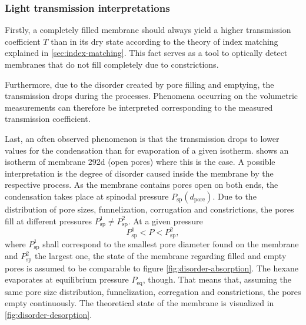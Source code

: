 \documentclass[../thesis.tex]{subfiles}
\begin{document}
            \subsubsection{Light transmission interpretations}
            \label{subsec:light-transmission-interpretation}

                

                Firstly, a completely filled membrane should always yield a higher transmission coefficient $T$ than in its dry state according to the theory of index matching explained in \cref{sec:index-matching}. This fact serves as a tool to optically detect membranes that do not fill completely due to constrictions.

                Furthermore, due to the disorder created by pore filling and emptying, the transmission drops during the processes. Phenomena occurring on the volumetric measurements can therefore be interpreted corresponding to the measured transmission coefficient.

                Last, an often observed phenomenon is that the transmission drops to lower values for the condensation than for evaporation of a given isotherm.  shows an isotherm of membrane 292d (open pores) where this is the case. A possible interpretation is the degree of disorder caused inside the membrane by the respective process. As the membrane contains pores open on both ends, the condensation takes place at spinodal pressure $P_\mathrm{sp}(d_\mathrm{pore})$. Due to the distribution of pore sizes, funnelization, corrugation and constrictions, the pores fill at different pressures $P_\mathrm{sp}^1 \neq P_\mathrm{sp}^2$. At a given pressure
                \begin{equation*}
                    P_\mathrm{sp}^1 < P < P_\mathrm{sp}^2,
                \end{equation*}
                where $P_\mathrm{sp}^1$ shall correspond to the smallest pore diameter found on the membrane and $P_\mathrm{sp}^2$ the largest one, the state of the me{}mbrane regarding filled and empty pores is assumed to be comparable to figure \cref{fig:disorder-absorption}. The hexane evaporates at equilibrium pressure $P_\mathrm{eq}$, though. That means that, assuming the same pore size distribution, funnelization, corregation and constrictions, the pores empty continuously. The theoretical state of the membrane is visualized in \cref{fig:disorder-desorption}.
                \medskip
\end{document}
